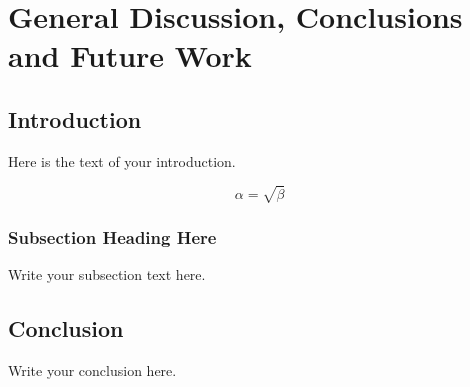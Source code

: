 \documentclass[10pt, letterpaper, twoside, openany]{thesis}
\begin{document}
\chapter{General Discussion, Conclusions and Future Work}
\section{Introduction}
Here is the text of your introduction.

\begin{equation}
    \label{simple_equation}
    \alpha = \sqrt{ \beta }
\end{equation}

\subsection{Subsection Heading Here}
Write your subsection text here.


\section{Conclusion}
Write your conclusion here.




\end{document}
